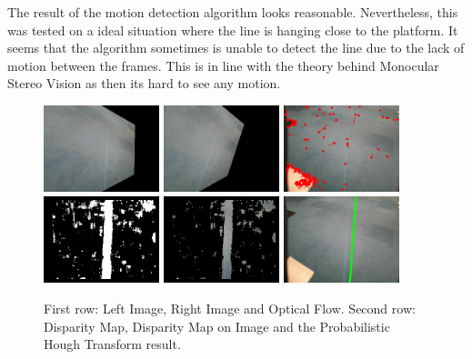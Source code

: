 \documentclass[a4paper]{article}
\begin{document}
The result of the motion detection algorithm looks reasonable. Nevertheless, this was tested on a ideal situation where the line is hanging close to the platform. It seems that the algorithm sometimes is unable to detect the line due to the lack of motion between the frames. This is in line with the theory behind Monocular Stereo Vision as then its hard to see any motion.
\begin{figure}[!ht]
\centering
\includegraphics[width=0.3\textwidth]{images/stereo_left.png}
\includegraphics[width=0.3\textwidth]{images/stereo_right.png}
\includegraphics[width=0.3\textwidth]{images/stereo_optical_flow.png}
\includegraphics[width=0.3\textwidth]{images/stereo_disparity.png}
\includegraphics[width=0.3\textwidth]{images/stereo_disparity_cut.png}
\includegraphics[width=0.3\textwidth]{images/stereo_PHT.png}
\caption{First row: Left Image, Right Image and Optical Flow. Second row: Disparity Map, Disparity Map on Image and the Probabilistic Hough Transform result.}
\label{motion_detection_results}
\end{figure}
\end{document}
